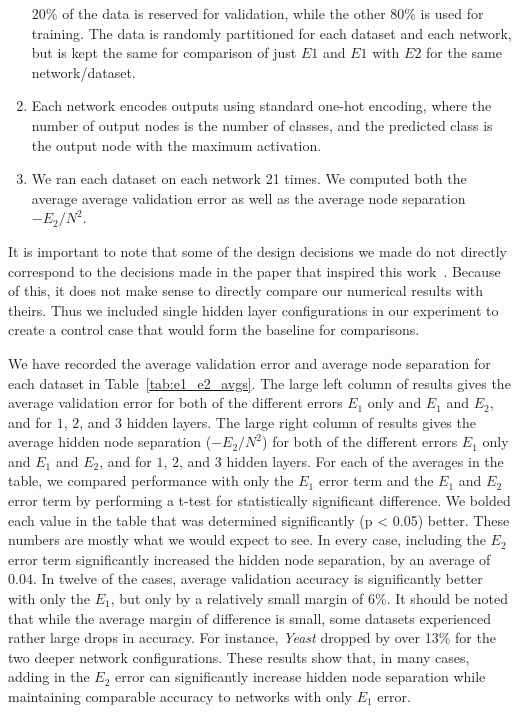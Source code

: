 \begin{enumerate}
  $20\%$ of the data is reserved for validation, while the other $80\%$ is
  used for training. The data is randomly partitioned for each dataset and
  each network, but is kept the same for comparison of just $E1$ and $E1$
  with $E2$ for the same network/dataset.
\item
  Each network encodes outputs using standard one-hot encoding, where the number
  of output nodes is the number of classes, and the predicted class is the
  output node with the maximum activation.
\item
  We ran each dataset on each network 21 times. We computed both the average
  average validation error as well as the average node separation
  $-E_2/N^2$.
\end{enumerate}

It is important to note that some of the design decisions we
made do not directly correspond to the decisions made in the paper
that inspired this work~\cite{thuan11}. Because of this, it does not
make sense to directly compare our numerical results with theirs.
Thus we included single hidden layer
configurations in our experiment to create a control case that would
form the baseline for comparisons. 

We have recorded the average validation error and average node separation
for each dataset in Table~\ref{tab:e1_e2_avgs}. The large left column of results
gives the average validation error for both of the different errors
$E_1$ only and $E_1$ and $E_2$, and for $1$, $2$, and $3$ hidden layers.
The large right column of results
gives the average hidden node separation ($-E_2/N^{2}$)
for both of the different errors
$E_1$ only and $E_1$ and $E_2$, and for $1$, $2$, and $3$ hidden layers.
For each of the averages in the table, we compared performance with only the
$E_1$ error term and the $E_1$ and $E_2$ error term by performing a t-test
for statistically significant difference. We bolded each value in the table
that was determined significantly (p < 0.05) better. These numbers are mostly what
we would expect to see. In every case, including the $E_2$ error term
significantly increased the hidden node separation, by an average of
0.04. In twelve of the cases, average validation accuracy is significantly
better with only the $E_1$, but only by a relatively small margin of
6\%. It should be noted that while the average margin of difference is
small, some datasets experienced rather large drops in accuracy. For instance,
\textit{Yeast} dropped by over 13\% for the two deeper network configurations.
These results show that, in many cases, adding in the $E_2$ error can
significantly increase hidden node separation while maintaining comparable
accuracy to networks with only $E_1$  error.

